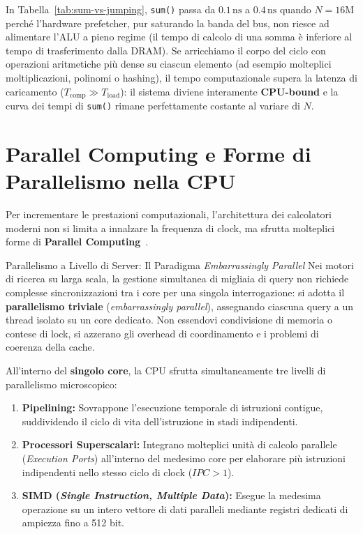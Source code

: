 \begin{example}
In Tabella~\ref{tab:sum-vs-jumping}, \texttt{sum()} passa da $0.1\,\text{ns}$ a $0.4\,\text{ns}$ quando $N=16\text{M}$ perch\'e l'hardware prefetcher, pur saturando la banda del bus, non riesce ad alimentare l'ALU a pieno regime (il tempo di calcolo di una somma \`e inferiore al tempo di trasferimento dalla DRAM).
Se arricchiamo il corpo del ciclo con operazioni aritmetiche pi\`u dense su ciascun elemento (ad esempio molteplici moltiplicazioni, polinomi o hashing), il tempo computazionale supera la latenza di caricamento ($T_{\text{comp}} \gg T_{\text{load}}$): il sistema diviene interamente \textbf{CPU-bound} e la curva dei tempi di \texttt{sum()} rimane perfettamente costante al variare di $N$.
\end{example}

\FloatBarrier
\section{Parallel Computing e Forme di Parallelismo nella CPU}
\label{sec:parallel-computing-cpu}

Per incrementare le prestazioni computazionali, l'architettura dei calcolatori moderni non si limita a innalzare la frequenza di clock, ma sfrutta molteplici forme di \textbf{Parallel Computing}~\cite{bakhvalov2024,slotin2023}.

\begin{noteblock}{Parallelismo a Livello di Server: Il Paradigma \textit{Embarrassingly Parallel}}
Nei motori di ricerca su larga scala, la gestione simultanea di migliaia di query non richiede complesse sincronizzazioni tra i core per una singola interrogazione: si adotta il \textbf{parallelismo triviale} (\textit{embarrassingly parallel}), assegnando ciascuna query a un thread isolato su un core dedicato. Non essendovi condivisione di memoria o contese di lock, si azzerano gli overhead di coordinamento e i problemi di coerenza della cache.
\end{noteblock}

All'interno del \textbf{singolo core}, la CPU sfrutta simultaneamente tre livelli di parallelismo microscopico:
\begin{enumerate}
    \item \textbf{Pipelining:} Sovrappone l'esecuzione temporale di istruzioni contigue, suddividendo il ciclo di vita dell'istruzione in stadi indipendenti.
    \item \textbf{Processori Superscalari:} Integrano molteplici unit\`a di calcolo parallele (\textit{Execution Ports}) all'interno del medesimo core per elaborare pi\`u istruzioni indipendenti nello stesso ciclo di clock ($IPC > 1$).
    \item \textbf{SIMD (\textit{Single Instruction, Multiple Data}):} Esegue la medesima operazione su un intero vettore di dati paralleli mediante registri dedicati di ampiezza fino a 512 bit.
\end{enumerate}

